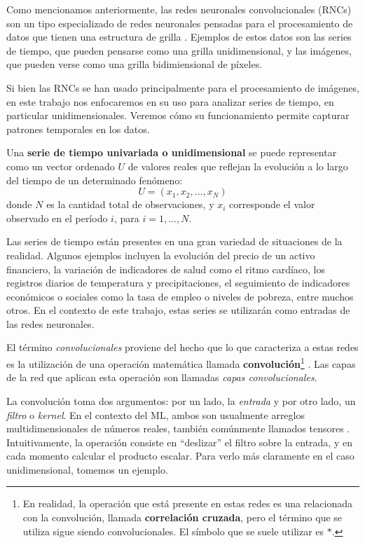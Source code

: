 \documentclass[../../main.tex]{subfiles}
\begin{document}
Como mencionamos anteriormente, las redes neuronales convolucionales (RNCs) son un tipo
especializado de redes neuronales pensadas para el procesamiento de datos que tienen una
estructura de grilla \cite{deep-learning}. Ejemplos de estos datos son las series de
tiempo, que pueden pensarse como una grilla unidimensional, y las imágenes, que pueden
verse como una grilla bidimiensional de píxeles.

Si bien las RNCs se han usado principalmente para el procesamiento de imágenes, en este
trabajo nos enfocaremos en su uso para analizar series de tiempo, en particular
unidimensionales. Veremos cómo su funcionamiento permite capturar patrones temporales en
los datos.

Una \textbf{serie de tiempo univariada o unidimensional} se puede representar como un
vector ordenado \(U\) de valores reales que reflejan la evolución a lo largo del tiempo
de un determinado fenómeno:
\[
    U = (x_1, x_2, ..., x_N)
\]
donde \(N\) es la cantidad total de observaciones, y \(x_i\) corresponde el valor observado
en el período \(i\), para \(i = 1,...,N\).

Las series de tiempo están presentes en una gran variedad de situaciones de la realidad.
Algunos ejemplos incluyen la evolución del precio de un activo financiero, la variación de
indicadores de salud como el ritmo cardíaco, los registros diarios de temperatura y
precipitaciones, el seguimiento de indicadores económicos o sociales como la tasa de
empleo o niveles de pobreza, entre muchos otros. En el contexto de este trabajo, estas
series se utilizarán como entradas de las redes neuronales.

El término \textit{convolucionales} proviene del hecho que lo que caracteriza a estas
redes es la utilización de una operación matemática llamada
\textbf{convolución}\footnote{En realidad, la operación que está presente en estas redes
es una relacionada con la convolución, llamada \textbf{correlación cruzada}, pero el
término que se utiliza sigue siendo convolucionales. El símbolo que se suele utilizar es
\(\ast\).} \cite{deep-learning}. Las capas de la red que aplican esta operación son
llamadas \textit{capas convolucionales}.

La convolución toma dos argumentos: por un lado, la \textit{entrada} y por otro lado, un
\textit{filtro} o \textit{kernel}. En el contexto del ML, ambos son usualmente arreglos
multidimensionales de números reales, también comúnmente llamados tensores
\cite{deep-learning}. Intuitivamente, la operación consiste en ``deslizar'' el filtro
sobre la entrada, y en cada momento calcular el producto escalar. Para verlo más
claramente en el caso unidimensional, tomemos un ejemplo.
\end{document}
